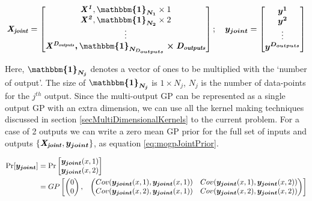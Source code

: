 \begin{equation}\label{eqMTGPDimension}
    \myMatrix{X_{joint}} = \begin{bmatrix}
\myMatrix{X^1}, \VEC{\mathbbm{1}_{N_{1}}} \times 1\\ 
\myMatrix{X^2}, \VEC{\mathbbm{1}_{N_{2}}} \times 2\\ 
\vdots\\ 
\myMatrix{X^{D_{outputs}}, \VEC{\mathbbm{1}_{N_{D_{outputs}}}} \times D_{outputs}}
\end{bmatrix} ; \quad 
\VEC{y_{joint}} = \begin{bmatrix}
\VEC{y^1}\\ 
\VEC{y^2}\\ 
\vdots\\ 
\VEC{y^{D_{outputs}}}
\end{bmatrix}
\end{equation}

Here, $\VEC{\mathbbm{1}_{N_{j}}}$ denotes a vector of ones to be multiplied with the `number of output'. The size of $\VEC{\mathbbm{1}_{N_{j}}}$ is $1 \times N_{j}$, $N_{j}$ is the number of data-points for the $j^{th}$ output. Since the multi-output GP can be represented as a single output GP with an extra dimension, we can use all the kernel making techniques discussed in section \ref{secMultiDimensionalKernels} to the current problem. For a case of 2 outputs we can write a zero mean GP prior for the full set of inputs and outputs $\{\bm{\mathit{X_{joint}}}, \boldsymbol{y_{joint}}\}$, as equation \ref{eq:mogpJointPrior}. 

\begin{equation}\label{eq:mogpJointPrior}
\begin{aligned}
       \Pr[\boldsymbol{y_{joint}}] & = \Pr\begin{bmatrix}   \boldsymbol{y_{joint}}(x, 1) \\ \boldsymbol{y_{joint}}(x, 2)   \end{bmatrix} \\
& = GP\begin{bmatrix}
   \begin{pmatrix}
   0\\ 
   0
   \end{pmatrix} ,& 
   \begin{pmatrix}
    Cov(\boldsymbol{y_{joint}}(x, 1), \boldsymbol{y_{joint}}(x, 1))  & Cov(\boldsymbol{y_{joint}}(x, 1), \boldsymbol{y_{joint}}(x, 2))\\ 
    Cov(\boldsymbol{y_{joint}}(x, 2), \boldsymbol{y_{joint}}(x, 1))     & Cov(\boldsymbol{y_{joint}}(x, 2), \boldsymbol{y_{joint}}(x, 2))
   \end{pmatrix}
   \end{bmatrix}
\end{aligned}
   \end{equation}


